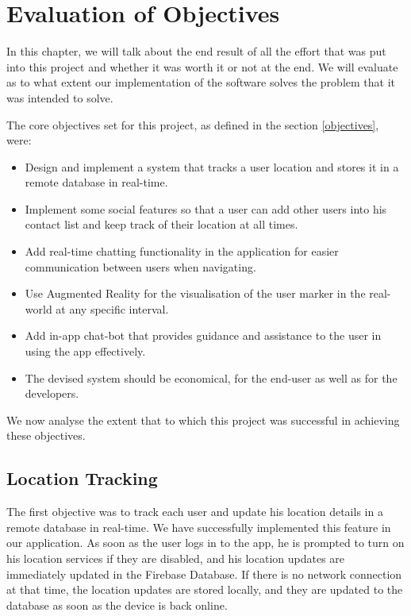 \chapter{Evaluation of Objectives} 
\label{chap4}


In this chapter, we will talk about the end result of all the effort that was put into this project and whether it was worth it or not at the end. We will evaluate as to what extent our implementation of the software solves the problem that it was intended to solve. 


The core objectives set for this project, as defined in the section \ref{objectives}, were:
\begin{itemize}
    \item Design and implement a system that tracks a user location and stores it in a remote database in real-time.
    \item Implement some social features so that a user can add other users into his contact list and keep track of their location at all times.
    \item Add real-time chatting functionality in the application for easier communication between users when navigating.
    \item Use Augmented Reality for the visualisation of the user marker in the real-world at any specific interval.
    \item Add in-app chat-bot that provides guidance and assistance to the user in using the app effectively.
    \item The devised system should be economical, for the end-user as well as for the developers.
\end{itemize}

We now analyse the extent that to which this project was successful in achieving these objectives.

\section{Location Tracking}
The first objective was to track each user and update his location details in a remote database in real-time. We have successfully implemented this feature in our application. As soon as the user logs in to the app, he is prompted to turn on his location services if they are disabled, and his location updates are immediately updated in the Firebase Database. If there is no network connection at that time, the location updates are stored locally, and they are updated to the database as soon as the device is back online.

